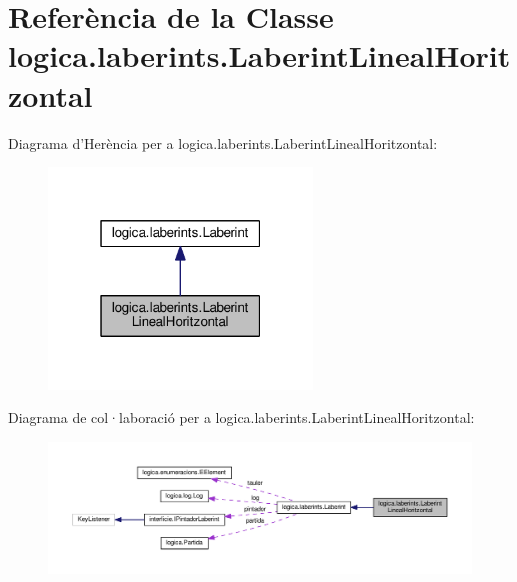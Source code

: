 \hypertarget{classlogica_1_1laberints_1_1_laberint_lineal_horitzontal}{\section{Referència de la Classe logica.\+laberints.\+Laberint\+Lineal\+Horitzontal}
\label{classlogica_1_1laberints_1_1_laberint_lineal_horitzontal}
}


Diagrama d'Herència per a logica.\+laberints.\+Laberint\+Lineal\+Horitzontal\+:\nopagebreak
\begin{figure}[H]
\begin{center}
\leavevmode
\includegraphics[width=199pt]{classlogica_1_1laberints_1_1_laberint_lineal_horitzontal__inherit__graph}
\end{center}
\end{figure}


Diagrama de col·laboració per a logica.\+laberints.\+Laberint\+Lineal\+Horitzontal\+:\nopagebreak
\begin{figure}[H]
\begin{center}
\leavevmode
\includegraphics[width=350pt]{classlogica_1_1laberints_1_1_laberint_lineal_horitzontal__coll__graph}
\end{center}
\end{figure}
